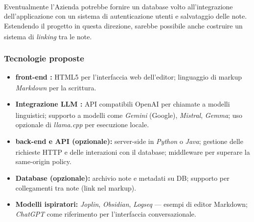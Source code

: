 \documentclass[a4paper,11pt]{article}
\begin{document}
\paragraph{}
Eventualmente l'Azienda potrebbe fornire un database volto all'integrazione dell'applicazione con un sistema di autenticazione utenti e salvataggio delle note. 
Estendendo il progetto\textsubscript{}
 in questa direzione, sarebbe possibile anche costruire un sistema di \textit{linking} tra le note.
\subsubsection{Tecnologie proposte}
\begin{itemize}[noitemsep, topsep=0pt]
 \item \textbf{front-end\textsubscript{}
:} HTML5 per l'interfaccia\textsubscript{} web dell'editor; linguaggio di markup \textit{Markdown} per la scrittura.
 \item \textbf{Integrazione LLM\textsubscript{}
:} API\textsubscript{}
 compatibili OpenAI per chiamate a modelli linguistici; supporto a modelli come \textit{Gemini} (Google), \textit{Mistral}, \textit{Gemma}; uso opzionale di \textit{llama.cpp} per esecuzione locale.
 \item \textbf{back-end\textsubscript{}
 e API\textsubscript{}
 (opzionale):} server-side in \textit{Python} o \textit{Java}; gestione delle richieste HTTP e delle interazioni con il database; middleware per superare la same-origin policy.
 \item \textbf{Database (opzionale):} archivio note e metadati su DB; supporto per collegamenti tra note (link nel markup).
 \item \textbf{Modelli ispiratori:} \textit{Joplin}, \textit{Obsidian}, \textit{Logseq} — esempi di editor Markdown; \textit{ChatGPT} come riferimento per l'interfaccia\textsubscript{} conversazionale.
\end{itemize}
\end{document}
